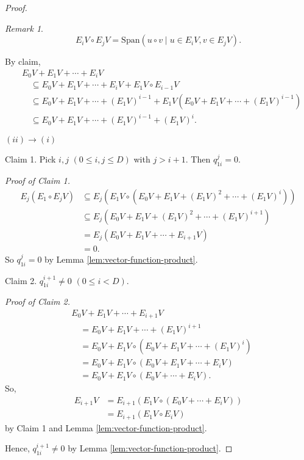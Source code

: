 \documentclass[
]{book}
\theoremstyle{definition}
\theoremstyle{definition}
\theoremstyle{definition}
\theoremstyle{definition}
\theoremstyle{remark}
\newtheorem*{remark}{Remark}
\begin{document}
\begin{proof}
\begin{remark}
\[E_iV \circ E_jV = \mathrm{Span}(u\circ v \mid u\in E_iV, v\in E_jV).\]
\end{remark}

By claim,
\begin{align}
& E_0V + E_1V + \cdots + E_iV\\
& \quad \subseteq E_0V + E_1V + \cdots + E_iV + E_1V\circ E_{i-1}V\\
& \quad \subseteq E_0V + E_1V + \cdots + (E_{1}V)^{i-1} + E_1V(E_0V + E_1V + \cdots + (E_{1}V)^{i-1})\\
& \quad \subseteq E_0V  + E_1V + \cdots + (E_{1}V)^{i-1} + (E_1V)^{i}.
\end{align}

\((ii)\to(i)\)

Claim 1. Pick \(i, j\) \((0\leq i,j\leq D)\) with \(j>i+1\). Then \(q^j_{1i} = 0\).

\emph{Proof of Claim 1.}
\begin{align}
E_j(E_1\circ E_jV) & \subseteq E_j(E_1V\circ(E_0V + E_1V + (E_1V)^2 + \cdots + (E_1V)^i))\\
& \subseteq E_j(E_0V + E_1V + (E_1V)^2 + \cdots + (E_1V)^{i+1})\\
& = E_j(E_0V + E_1V + \cdots + E_{i+1}V)\\
& = 0.
\end{align}
So \(q^j_{1i}=0\) by Lemma \ref{lem:vector-function-product}.

Claim 2. \(q^{i+1}_{1i} \neq 0\) \((0\leq i < D)\).

\emph{Proof of Claim 2.}
\begin{align}
& E_0V + E_1V + \cdots + E_{i+1}V\\
& \quad = E_0V + E_1V + \cdots + (E_1V)^{i+1}\\
& \quad = E_0V + E_1V\circ(E_0V + E_1V + \cdots + (E_{1}V)^{i})\\
& \quad = E_0V + E_1V\circ(E_0V + E_1V + \cdots + E_iV)\\
& \quad = E_0V  + E_1V\circ(E_0V + \cdots + E_iV).
\end{align}
So,
\begin{align}
E_{i+1}V & = E_{i+1}(E_1V\circ (E_0V + \cdots + E_iV))\\
& = E_{i+1}(E_1V \circ E_iV)
\end{align}
by Claim 1 and Lemma \ref{lem:vector-function-product}.

Hence, \(q^{i+1}_{1i}\neq 0\) by Lemma \ref{lem:vector-function-product}.

\end{proof}
\end{document}
